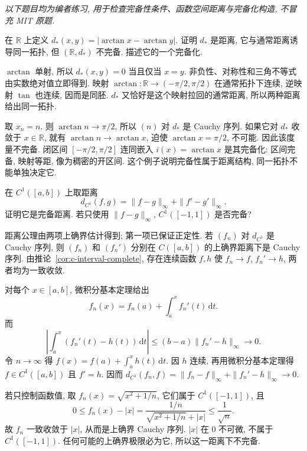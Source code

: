 \emph{以下题目均为编者练习, 用于检查完备性条件、函数空间距离与完备化构造, 不冒充 MIT 原题.}

\begin{exercise}\label{ex:complete-topology-metric}
在 $\mathbb R$ 上定义 $d_*(x,y)=|\arctan x-\arctan y|$. 证明 $d_*$ 是距离, 它与通常距离诱导同一拓扑, 但 $(\mathbb R,d_*)$ 不完备. 描述它的一个完备化.
\end{exercise}
\begin{solution}
$\arctan$ 单射, 所以 $d_*(x,y)=0$ 当且仅当 $x=y$. 非负性、对称性和三角不等式由实数绝对值立即得到. 映射
$\arctan:\mathbb R\to(-\pi/2,\pi/2)$ 在通常拓扑下连续, 逆映射 $\tan$ 也连续, 因而是同胚. $d_*$ 又恰好是这个映射拉回的通常距离, 所以两种距离给出同一拓扑.

取 $x_n=n$. 则 $\arctan n\to\pi/2$, 所以 $(n)$ 对 $d_*$ 是 Cauchy 序列. 如果它对 $d_*$ 收敛于 $x\in\mathbb R$, 就有 $\arctan n\to\arctan x$, 迫使 $\arctan x=\pi/2$, 不可能. 因此该度量不完备. 闭区间 $[-\pi/2,\pi/2]$ 连同嵌入 $i(x)=\arctan x$ 是其完备化: 区间完备, 映射等距, 像为稠密的开区间. 这个例子说明完备性属于距离结构, 同一拓扑不能单独决定它.
\end{solution}

\begin{exercise}\label{ex:c1-complete}
在 $C^1([a,b])$ 上取距离
\[
d_{C^1}(f,g)=\|f-g\|_\infty+\|f'-g'\|_\infty.
\]
证明它是完备距离. 若只使用 $\|f-g\|_\infty$, $C^1([-1,1])$ 是否完备?
\end{exercise}
\begin{solution}
距离公理由两项上确界估计得到; 第一项已保证正定性. 若 $(f_n)$ 对 $d_{C^1}$ 是 Cauchy 序列, 则 $(f_n)$ 和 $(f_n')$ 分别在 $C([a,b])$ 的上确界距离下是 Cauchy 序列. 由推论~\ref{cor:c-interval-complete}, 存在连续函数 $f,h$ 使 $f_n\to f$, $f_n'\to h$, 两者均为一致收敛.

对每个 $x\in[a,b]$, 微积分基本定理给出
\[
f_n(x)=f_n(a)+\int_a^x f_n'(t)\,\mathrm dt.
\]
而
\[
\left|\int_a^x(f_n'(t)-h(t))\,\mathrm dt\right|
\leq(b-a)\|f_n'-h\|_\infty\longrightarrow0.
\]
令 $n\to\infty$ 得 $f(x)=f(a)+\int_a^xh(t)\,\mathrm dt$. 因 $h$ 连续, 再用微积分基本定理得 $f\in C^1([a,b])$ 且 $f'=h$. 因而
$d_{C^1}(f_n,f)=\|f_n-f\|_\infty+\|f_n'-h\|_\infty\to0$.

若只控制函数值, 取 $f_n(x)=\sqrt{x^2+1/n}$, 它们属于 $C^1([-1,1])$, 且
\[
0\leq f_n(x)-|x|
=\frac{1/n}{\sqrt{x^2+1/n}+|x|}\leq\frac1{\sqrt n}.
\]
故 $f_n$ 一致收敛于 $|x|$, 从而是上确界 Cauchy 序列. $|x|$ 在 $0$ 不可微, 不属于 $C^1([-1,1])$. 任何可能的上确界极限必为它, 所以这一距离下不完备.
\end{solution}

